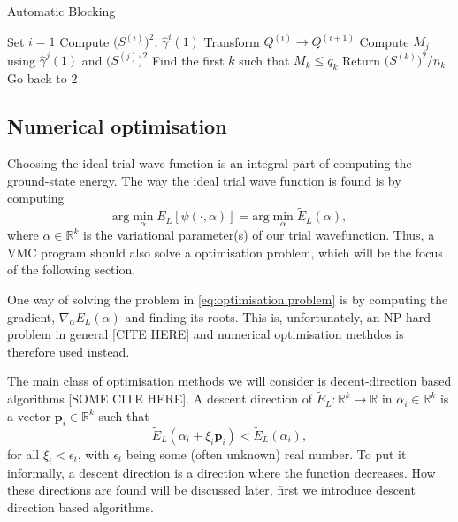 \documentclass[11pt,a4paper]{article}
\numberwithin{equation}{section}
\begin{document}
\begin{algorithm}
	\caption{Automatic Blocking}
	\label{Alg:AutomaticBlocking}
	\begin{algorithmic}[1]
		\State Set $i=1$
		\State Compute $\big(S^{(i)}\big)^2, \, \hat\gamma^i(1)$
		\State Transform $Q^{(i)}\to Q^{(i+1)}$
		\State Compute $M_j$ using $\hat{\gamma}^j(1)$ and $\big(S^{(j)}\big)^2$ 
		\State Find the first $k$ such that $M_k\leq q_k$
		\State Return $\big(S^{(k)}\big)^2/n_k$
		\Else
		\State Go back to  2
		\EndIf
		\EndProcedure
	\end{algorithmic}
\end{algorithm}
































\subsection{Numerical optimisation}
Choosing the ideal trial wave function is an integral part of computing the ground-state energy. The way the ideal trial wave function is found is by computing
\begin{equation}
    \text{arg} \min_{\alpha} E_L[\psi(\cdot, \alpha)] = \text{arg} \min_{\alpha} \tilde{E}_L(\alpha), \label{eq:optimisation.problem}
\end{equation}
where $\alpha \in \mathbb{R}^k$ is the variational parameter(s) of our trial wavefunction. Thus, a VMC program should also solve a optimisation problem, which will be the focus of the following section.

One way of solving the problem in \cref{eq:optimisation.problem} is by computing the gradient, $\nabla_\alpha E_L(\alpha)$ and finding its roots. This is, unfortunately, an NP-hard problem in general [CITE HERE] and numerical optimisation methdos is therefore used instead.

The main class of optimisation methods we will consider is decent-direction based algorithms [SOME CITE HERE]. A descent direction of $\tilde{E}_L: \mathbb{R}^k \to \mathbb{R}$ in $\alpha_i \in \mathbb{R}^k$ is a vector $\bm{p}_i \in \mathbb{R}^k$ such that
\begin{equation}
    \tilde{E}_L(\alpha_i + \xi_i \bm{p}_i) < \tilde{E}_L(\alpha_i),
\end{equation}
for all $\xi_i < \epsilon_i$, with $\epsilon_i$ being some (often unknown) real number. To put it informally, a descent direction is a direction where the function decreases. How these directions are found will be discussed later, first we introduce descent direction based algorithms.
\end{document}
